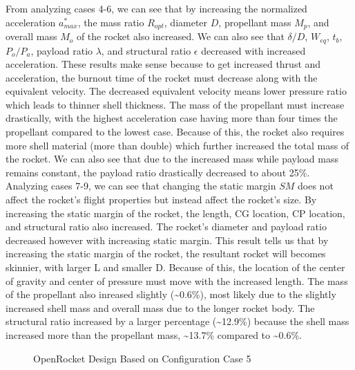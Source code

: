 \documentclass{report}
\begin{document}
\noindent From analyzing cases 4-6, we can see that by increasing the normalized acceleration $a^*_{max}$, the mass ratio $R_{opt}$, diameter $D$, propellant mass $M_p$, and overall mass $M_o$ of the rocket also increased.
We can also see that $\delta/D$, $W_{eq}$, $t_b$, $P_o/P_a$, payload ratio $\lambda$, and structural ratio $\epsilon$ decreased with increased acceleration.
These results make sense because to get increased thrust and acceleration, the burnout time of the rocket must decrease along with the equivalent velocity.
The decreased equivalent velocity means lower pressure ratio which leads to thinner shell thickness. 
The mass of the propellant must increase drastically, with the highest acceleration case having more than four times the propellant compared to the lowest case.
Because of this, the rocket also requires more shell material (more than double) which further increased the total mass of the rocket.
We can also see that due to the increased mass while payload mass remains constant, the payload ratio drastically decreased to about 25\%. \\

\noindent Analyzing cases 7-9, we can see that changing the static margin $SM$ does not affect the rocket's flight properties but instead affect the rocket's size.
By increasing the static margin of the rocket, the length, CG location, CP location, and structural ratio also increased.
The rocket's diameter and payload ratio decreased however with increasing static margin. 
This result tells us that by increasing the static margin of the rocket, the resultant rocket will becomes skinnier, with larger L and smaller D. 
Because of this, the location of the center of gravity and center of pressure must move with the increased length.
The mass of the propellant also inreased slightly (\textasciitilde0.6\%), most likely due to the slightly increased shell mass and overall mass due to the longer rocket body.
The structural ratio increased by a larger percentage (\textasciitilde12.9\%) because the shell mass increased more than the propellant mass, \textasciitilde13.7\% compared to \textasciitilde0.6\%.\\

\begin{figure}[h!]
    \centering
    \caption{OpenRocket Design Based on Configuration Case 5}
    \label{fig:rocketDesign}
\end{figure}
\end{document}
